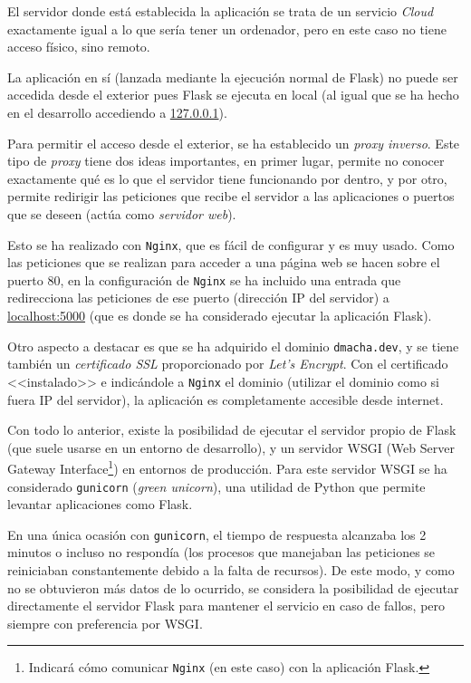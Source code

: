 El servidor donde está establecida la aplicación se trata de un servicio
\textit{Cloud} exactamente igual a lo que sería tener un ordenador, pero en este
caso no tiene acceso físico, sino remoto.

La aplicación en sí (lanzada mediante la ejecución normal de Flask) no puede ser
accedida desde el exterior pues Flask se ejecuta en local (al igual que se ha
hecho en el desarrollo accediendo a \url{127.0.0.1}).

Para permitir el acceso desde el exterior, se ha establecido un \emph{proxy
inverso}. Este tipo de \textit{proxy} tiene dos ideas importantes, en primer
lugar, permite no conocer exactamente qué es lo que el servidor tiene
funcionando por dentro, y por otro, permite redirigir las peticiones que recibe
el servidor a las aplicaciones o puertos que se deseen (actúa como
\emph{servidor web}).

Esto se ha realizado con \texttt{Nginx}, que es fácil de configurar y es muy
usado. Como las peticiones que se realizan para acceder a una página web se
hacen sobre el puerto 80, en la configuración de \texttt{Nginx} se ha incluido
una entrada que redirecciona las peticiones de ese puerto (dirección IP del
servidor) a \url{localhost:5000} (que es donde se ha considerado ejecutar la
aplicación Flask).

Otro aspecto a destacar es que se ha adquirido el dominio \texttt{dmacha.dev}, y
se tiene también un \emph{certificado SSL} proporcionado por \textit{Let's
Encrypt}. Con el certificado <<instalado>> e indicándole a \texttt{Nginx} el
dominio (utilizar el dominio como si fuera IP del servidor), la aplicación es
completamente accesible desde internet.

Con todo lo anterior, existe la posibilidad de ejecutar el servidor propio de
Flask (que suele usarse en un entorno de desarrollo), y un servidor WSGI (Web
Server Gateway Interface\footnote{Indicará cómo comunicar \texttt{Nginx} (en
este caso) con la aplicación Flask.}) en entornos de producción. Para este
servidor WSGI se ha considerado \texttt{gunicorn} (\textit{green unicorn}), una
utilidad de Python que permite levantar aplicaciones como Flask. 

En una única ocasión con \texttt{gunicorn}, el tiempo de respuesta alcanzaba los
2 minutos o incluso no respondía (los procesos que manejaban las peticiones se
reiniciaban constantemente debido a la falta de recursos). De este modo, y como
no se obtuvieron más datos de lo ocurrido, se considera la posibilidad de
ejecutar directamente el servidor Flask para mantener el servicio en caso de
fallos, pero siempre con preferencia por WSGI.